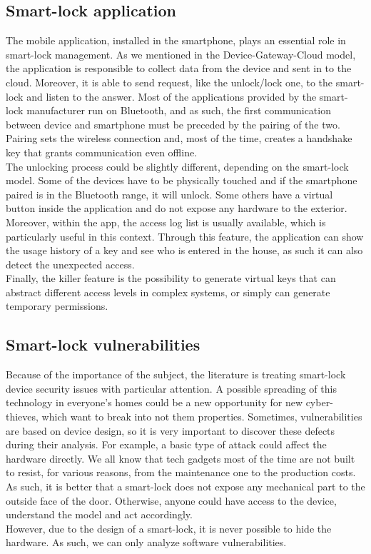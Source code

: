 \subsection{Smart-lock application}
\label{sec:smart-app}
The mobile application, installed in the smartphone, plays an essential role in smart-lock management. As we mentioned in the Device-Gateway-Cloud model, the application is responsible to collect data from the device and sent in to the cloud. Moreover, it is able to send request, like the unlock/lock one, to the smart-lock and listen to the answer. Most of the applications provided by the smart-lock manufacturer run on Bluetooth, and as such, the first communication between device and smartphone must be preceded by the pairing of the two. Pairing sets the wireless connection and, most of the time, creates a handshake key that grants communication even offline. 
\\ The unlocking process could be slightly different, depending on the smart-lock model. Some of the devices have to be physically touched and if the smartphone paired is in the Bluetooth range, it will unlock. Some others have a virtual button inside the application and do not expose any hardware to the exterior. 
\\ Moreover, within the app, the access log list is usually available, which is particularly useful in this context. Through this feature, the application can show the usage history of a key and see who is entered in the house, as such it can also detect the unexpected access.
\\ Finally, the killer feature is the possibility to generate virtual keys that can abstract different access levels in complex systems, or simply can generate temporary permissions.

\subsection{Smart-lock vulnerabilities}
\label{sec:smartlockvulnerabilities}
Because of the importance of the subject, the literature is treating smart-lock device security issues with particular attention. A possible spreading of this technology in everyone's homes could be a new opportunity for new cyber-thieves, which want to break into not them properties. 
Sometimes, vulnerabilities are based on device design, so it is very important to discover these defects during their analysis. 
For example, a basic type of attack could affect the hardware directly. We all know that tech gadgets most of the time are not built to resist, for various reasons, from the maintenance one to the production costs. As such, it is better that a smart-lock does not expose any mechanical part to the outside face of the door. Otherwise, anyone could have access to the device, understand the model and act accordingly. 
\\ However, due to the design of a smart-lock, it is never possible to hide the hardware. As such, we can only analyze software vulnerabilities.

